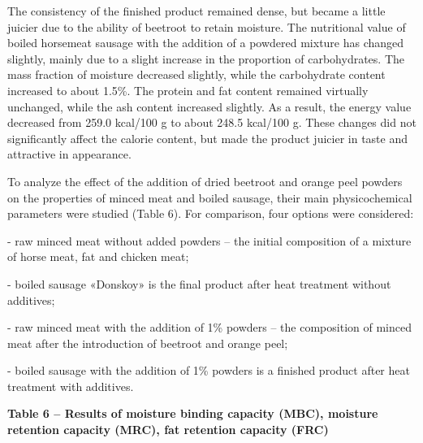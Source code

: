 \begin{multicols}{2}
The consistency of the finished product remained dense, but became a
little juicier due to the ability of beetroot to retain moisture. The
nutritional value of boiled horsemeat sausage with the addition of a
powdered mixture has changed slightly, mainly due to a slight increase
in the proportion of carbohydrates. The mass fraction of moisture
decreased slightly, while the carbohydrate content increased to about
1.5\%. The protein and fat content remained virtually unchanged, while
the ash content increased slightly. As a result, the energy value
decreased from 259.0 kcal/100 g to about 248.5 kcal/100 g. These changes
did not significantly affect the calorie content, but made the product
juicier in taste and attractive in appearance.

To analyze the effect of the addition of dried beetroot and orange peel
powders on the properties of minced meat and boiled sausage, their main
physicochemical parameters were studied (Table 6). For comparison, four
options were considered:

- raw minced meat without added powders -- the initial composition of a
mixture of horse meat, fat and chicken meat;

- boiled sausage «Donskoy» is the final product after heat treatment
without additives;

- raw minced meat with the addition of 1\% powders -- the composition of
minced meat after the introduction of beetroot and orange peel;

- boiled sausage with the addition of 1\% powders is a finished product
after heat treatment with additives.
\end{multicols}

{\bfseries Table 6 -- Results of moisture binding capacity (MBC), moisture retention capacity (MRC), fat retention capacity (FRC)}

